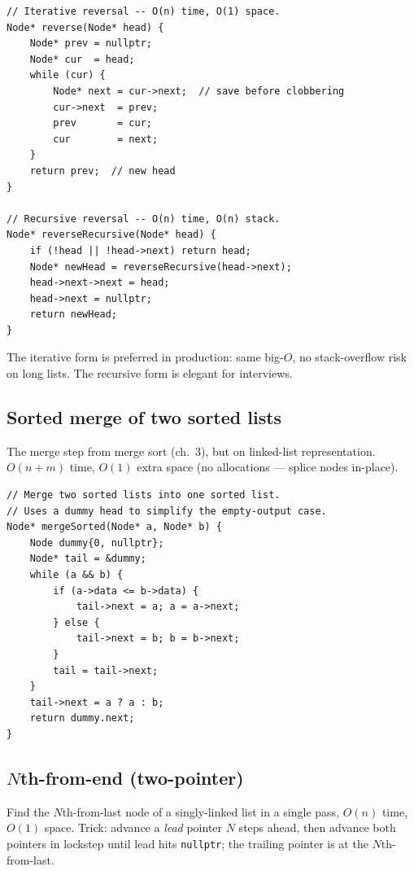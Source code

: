 \documentclass[11pt]{article}
\begin{document}
\begin{lstlisting}[basicstyle=\ttfamily\small,frame=single]
// Iterative reversal -- O(n) time, O(1) space.
Node* reverse(Node* head) {
    Node* prev = nullptr;
    Node* cur  = head;
    while (cur) {
        Node* next = cur->next;  // save before clobbering
        cur->next  = prev;
        prev       = cur;
        cur        = next;
    }
    return prev;  // new head
}

// Recursive reversal -- O(n) time, O(n) stack.
Node* reverseRecursive(Node* head) {
    if (!head || !head->next) return head;
    Node* newHead = reverseRecursive(head->next);
    head->next->next = head;
    head->next = nullptr;
    return newHead;
}
\end{lstlisting}

The iterative form is preferred in production: same big-$O$,
no stack-overflow risk on long lists. The recursive form is
elegant for interviews.

\subsection*{Sorted merge of two sorted lists}

The merge step from merge sort (ch.~3), but on linked-list
representation. $O(n + m)$ time, $O(1)$ extra space (no
allocations --- splice nodes in-place).

\begin{lstlisting}[basicstyle=\ttfamily\small,frame=single]
// Merge two sorted lists into one sorted list.
// Uses a dummy head to simplify the empty-output case.
Node* mergeSorted(Node* a, Node* b) {
    Node dummy{0, nullptr};
    Node* tail = &dummy;
    while (a && b) {
        if (a->data <= b->data) {
            tail->next = a; a = a->next;
        } else {
            tail->next = b; b = b->next;
        }
        tail = tail->next;
    }
    tail->next = a ? a : b;
    return dummy.next;
}
\end{lstlisting}

\subsection*{$N$th-from-end (two-pointer)}

Find the $N$th-from-last node of a singly-linked list in a
single pass, $O(n)$ time, $O(1)$ space. Trick: advance a
\emph{lead} pointer $N$ steps ahead, then advance both pointers
in lockstep until lead hits \texttt{nullptr}; the trailing
pointer is at the $N$th-from-last.
\end{document}
